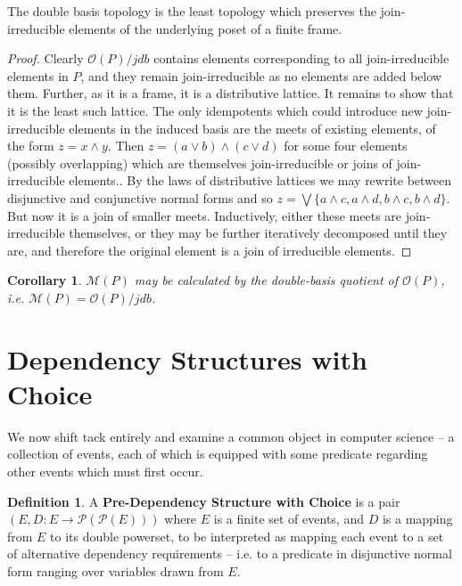 \documentclass[hoptionsi,review,format=sigplan]{acmart}
\newtheorem*{corollary}{Corollary}
\theoremstyle{definition}
\newtheorem{definition}{Definition}[section]
\newcommand{\Mcc}{\mathcal{M}}
\newcommand{\Oc}{\mathcal{O}}
\newcommand{\Pc}{\mathcal{P}}
\begin{document}
\begin{theorem}
The double basis topology is the least topology which preserves the join-irreducible elements of the underlying poset of a finite frame.
\end{theorem}
\begin{proof}
Clearly \(\Oc(P)/jdb\) contains elements corresponding to all join-irreducible elements in \(P\), and they remain join-irreducible as no elements are added below them. Further, as it is a frame, it is a distributive lattice. It remains to show that it is the least such lattice. The only idempotents which could introduce new join-irreducible elements in the induced basis are the meets of existing elements, of the form  \(z = x \wedge y\). Then \(z = (a \vee b) \wedge (c \vee d)\) for some four elements (possibly overlapping) which are themselves join-irreducible or joins of join-irreducible elements..  By the laws of distributive lattices we may rewrite between disjunctive and conjunctive normal forms and so \(z = \bigvee \{a \wedge c, a \wedge d, b \wedge c, b \wedge d\}\).  But now it is a join of smaller meets. Inductively, either these meets are join-irreducible themselves, or they may be further iteratively decomposed until they are, and therefore the original element is a join of irreducible elements.
\end{proof}

\begin{corollary}
\(\Mcc(P)\) may be calculated by the double-basis quotient of \(\Oc(P)\), i.e. \(\Mcc(P) = \Oc(P)/jdb\).
\end{corollary}





\section{Dependency Structures with Choice}
We now shift tack entirely and examine a common object in computer science -- a collection of events, each of which is equipped with some predicate regarding other events which must first occur.

\begin{definition}
A \textbf{Pre-Dependency Structure with Choice} is a pair \((E, D : E \rightarrow \Pc(\Pc(E)))\) where \(E\) is a finite set of events, and \(D\) is a mapping from \(E\) to its double powerset, to be interpreted as mapping each event to a set of alternative dependency requirements -- i.e. to a predicate in disjunctive normal form ranging over variables drawn from \(E\).
\end{definition}
\end{document}

